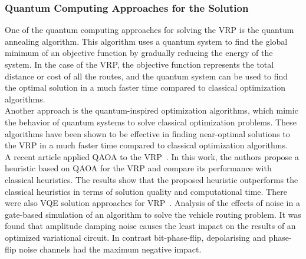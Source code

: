 \subsubsection{Quantum Computing Approaches for the Solution}
One of the quantum computing approaches for solving the VRP is the quantum annealing algorithm.
This algorithm uses a quantum system to find the global minimum of an objective function by gradually reducing the
energy of the system. In the case of the VRP, the objective function represents the total distance or cost of all
the routes, and the quantum system can be used to find the optimal solution in a much faster time compared to classical
optimization algorithms.\\
Another approach is the quantum-inspired optimization algorithms, which mimic the behavior of quantum systems to solve
classical optimization problems. These algorithms have been shown to be effective in finding near-optimal solutions to
the VRP in a much faster time compared to classical optimization algorithms.\\
A recent article applied QAOA to the VRP~\cite{9605345}. In this work, the authors propose a heuristic
based on QAOA for the VRP and
compare its performance with classical heuristics. The results show that the proposed heuristic
outperforms the classical heuristics in terms of solution quality and computational time.
There were also VQE solution approaches for VRP~\cite{mohanty2022analysis}.
Analysis of the effects of noise in a gate-based
simulation of an algorithm to solve the vehicle routing problem.
It was found that amplitude damping
noise causes the least impact on the results of an optimized
variational circuit. In contrast bit-phase-flip, depolarising and
phase-flip noise channels had the maximum negative impact.



